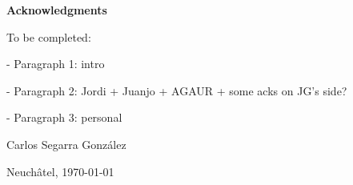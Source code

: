 \vspace*{2cm}
\Huge
\textbf{Acknowledgments} \label{sec:acknowledgments}
\normalsize

\vspace{1cm}

To be completed:

- Paragraph 1: intro

- Paragraph 2: Jordi + Juanjo + AGAUR + some acks on JG's side?

- Paragraph 3: personal

\vspace{1cm}

\begin{flushright}
Carlos Segarra Gonz\'alez

Neuch\^atel, \today
\end{flushright}

\vspace*{\fill}
